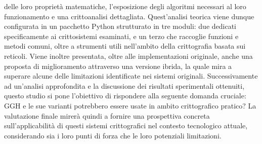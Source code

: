 delle loro proprietà matematiche, l'esposizione degli algoritmi necessari al loro 
funzionamento e una crittoanalisi dettagliata. 
Quest'analisi teorica viene dunque configurata in un pacchetto Python 
strutturato in tre moduli: due dedicati specificamente ai crittosistemi esaminati, e un 
terzo che raccoglie funzioni e metodi comuni, oltre a strumenti utili nell'ambito della 
crittografia basata sui reticoli. Viene inoltre presentata, oltre alle implementazioni originale, 
anche una proposta di miglioramento attraverso una versione ibrida, la quale
mira a superare alcune delle limitazioni identificate nei sistemi originali. 
Successivamente ad un'analisi approfondita e la discussione dei risultati sperimentali ottenuiti,
questo studio si pone l'obiettivo di rispondere alla seguente domanda cruciale: GGH e le sue varianti 
potrebbero essere usate in ambito crittografico pratico? La valutazione finale mirerà quindi a 
fornire una prospettiva concreta sull'applicabilità di questi sistemi crittografici 
nel contesto tecnologico attuale, considerando sia i loro punti di forza che le loro 
potenziali limitazioni.
